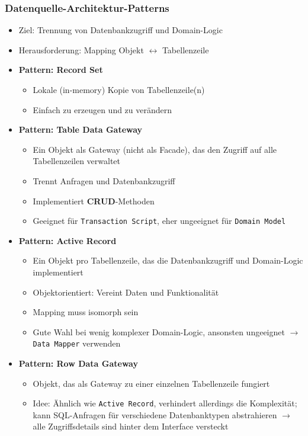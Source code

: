 \subsubsection{Datenquelle-Architektur-Patterns}
\begin{itemize}
	\item Ziel: Trennung von Datenbankzugriff und Domain-Logic
	\item Herausforderung: Mapping Objekt \(\leftrightarrow\) Tabellenzeile
	\item \textbf{Pattern: Record Set}
	\begin{itemize}
		\item Lokale (in-memory) Kopie von Tabellenzeile(n)
		\item Einfach zu erzeugen und zu verändern
	\end{itemize}
	\item \textbf{Pattern: Table Data Gateway}
	\begin{itemize}
		\item Ein Objekt als Gateway (nicht als Facade), das den Zugriff auf alle Tabellenzeilen verwaltet
		\item Trennt Anfragen und Datenbankzugriff
		\item Implementiert \textbf{CRUD}-Methoden
		\item Geeignet für \texttt{Transaction Script}, eher ungeeignet für \texttt{Domain Model}
	\end{itemize}
	\item \textbf{Pattern: Active Record}
	\begin{itemize}
		\item Ein Objekt pro Tabellenzeile, das die Datenbankzugriff und Domain-Logic implementiert
		\item Objektorientiert: Vereint Daten und Funktionalität
		\item Mapping muss isomorph sein
		\item Gute Wahl bei wenig komplexer Domain-Logic, ansonsten ungeeignet \(\rightarrow\) \texttt{Data Mapper} verwenden
	\end{itemize}
	\item \textbf{Pattern: Row Data Gateway}
	\begin{itemize}
		\item Objekt, das als Gateway zu einer einzelnen Tabellenzeile fungiert
		\item Idee: Ähnlich wie \texttt{Active Record}, verhindert allerdings die Komplexität; kann SQL-Anfragen für verschiedene Datenbanktypen abstrahieren \(\rightarrow\) alle Zugriffsdetails sind hinter dem Interface versteckt

\end{itemize}
\end{itemize}
